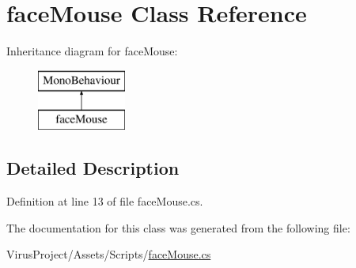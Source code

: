\hypertarget{classface_mouse}{}\section{face\+Mouse Class Reference}
\label{classface_mouse}
Inheritance diagram for face\+Mouse\+:\begin{figure}[H]
\begin{center}
\leavevmode
\includegraphics[height=2.000000cm]{classface_mouse}
\end{center}
\end{figure}


\subsection{Detailed Description}


Definition at line 13 of file face\+Mouse.\+cs.



The documentation for this class was generated from the following file\+:\begin{DoxyCompactItemize}
\item 
Virus\+Project/\+Assets/\+Scripts/\hyperlink{face_mouse_8cs}{face\+Mouse.\+cs}\end{DoxyCompactItemize}
